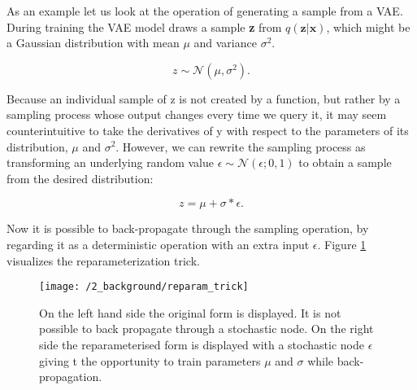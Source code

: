 As an example let us look at the operation of generating a sample from a VAE.
During training the VAE model draws a sample \textbf{z} from
$q(\textbf{z}|\textbf{x})$, which might be a Gaussian distribution with mean
$\mu$ and variance $\sigma^2$.

\begin{equation}
    z \sim \mathcal{N}(\mu, \sigma^2).
\end{equation}

Because an individual sample of z is not created by a function, but rather by a
sampling process whose output changes every time we query it, it may seem
counterintuitive to take the derivatives of y with respect to the parameters of
its distribution, $\mu$ and $\sigma^2$. However, we can rewrite the sampling
process as transforming an underlying random value $\epsilon \sim
\mathcal{N}(\epsilon; 0, 1)$ to obtain a sample from the desired distribution:

\begin{equation}
    z = \mu + \sigma * \epsilon.
\end{equation}

Now it is possible to back-propagate through the sampling operation, by
regarding it as a deterministic operation with an extra input $\epsilon$.
Figure \ref{reparam_trick} visualizes the reparameterization trick.

\begin{figure}
	\centering
	\texttt{[image: /2\_background/reparam\_trick]}
    \caption{On the left hand side the original form is displayed. It is not
    possible to back propagate through a stochastic node. On the right side the
    reparameterised form is displayed with a stochastic node $\epsilon$ giving t
    the opportunity to train parameters $\mu$ and $\sigma$ while
    back-propagation.} 
	\label{reparam_trick}
\end{figure}
